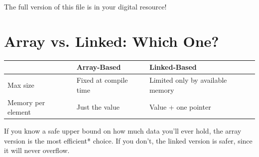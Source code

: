 The full version of this file is in your digital resource!

\section{Array vs. Linked: Which One?}

\begin{center}
\begin{tabular}{|l|l|l|}
\hline
 & \textbf{Array-Based} & \textbf{Linked-Based} \\
\hline
Max size & Fixed at compile time & Limited only by available memory \\
\hline
Memory per element & Just the value & Value + one pointer \\
\hline
\end{tabular}
\end{center}

If you know a safe upper bound on how much data you'll ever hold, the array version is the most efficient* choice. If you don't, the linked version is safer, since it will never overflow.
